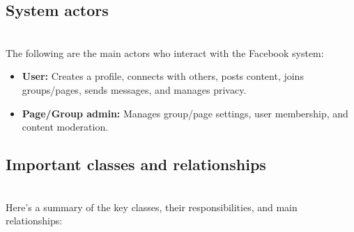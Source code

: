 \subsection{System actors}\label{DqwR7UIdrQ4DxUOyzPzke}
\\
The following are the main actors who interact with the Facebook system:

\begin{itemize}
\item
\protect{}\label{hgztfItQrCDlYQIk2eu-T}
\textbf{User:} Creates a profile, connects with others, posts content, joins groups/pages, sends messages, and manages privacy.
\item
\protect{}\label{o3sP5gLx52uWqFFpXcZvk}
\textbf{Page/Group admin:} Manages group/page settings, user membership, and content moderation.
\end{itemize}

\subsection{Important classes and relationships}\label{1XMxn71GSZhCcmEw2bFbD}
\\
Here's a summary of the key classes, their responsibilities, and main relationships:

